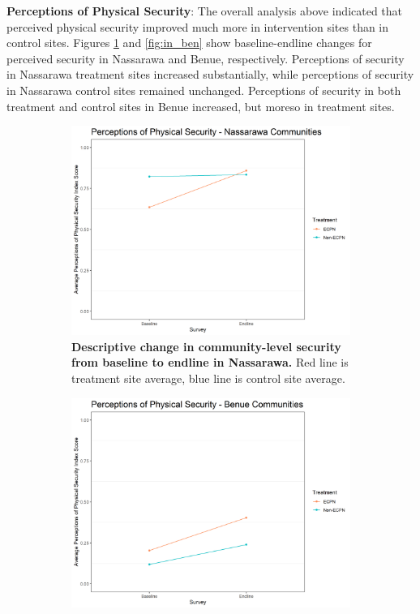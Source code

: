 \documentclass[11pt]{article}
\begin{document}
\textbf{Perceptions of Physical Security}: The overall analysis above
indicated that perceived physical security improved much more in
intervention sites than in control sites. Figures \ref{fig:in_nas} and
\ref{fig:in_ben} show baseline-endline changes for perceived security in
Nassarawa and Benue, respectively. Perceptions of security in Nassarawa
treatment sites increased substantially, while perceptions of security
in Nassarawa control sites remained unchanged. Perceptions of security
in both treatment and control sites in Benue increased, but moreso in
treatment sites.

\begin{figure}[H]
    \begin{subfigure}[b]{.48\textwidth}
    \centering
        \includegraphics[width=\linewidth]{../../../figs/inComm_plot_nas.png}
        \caption{\textbf{Descriptive change in community-level security from baseline to endline in Nassarawa.} Red line is treatment site average, blue line is control site average.}
        \label{fig:in_nas}
    \end{subfigure}
    \hfill
    \begin{subfigure}[b]{.48\textwidth}
    \centering
        \includegraphics[width=\linewidth]{../../../figs/inComm_plot_ben.png}

\end{subfigure}
\end{figure}
\end{document}
